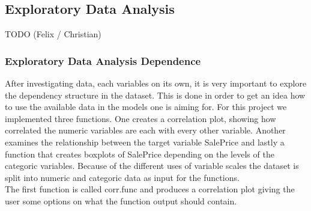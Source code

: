 \subsection{Exploratory Data Analysis}
TODO (Felix / Christian)
\subsubsection{Exploratory Data Analysis Dependence}
After investigating data, each variables on its own, it is very important to explore the dependency structure in the dataset. This is done in order to get an idea how to use the available data in the models one is aiming for. For this project we implemented three functions. One creates a correlation plot, showing how correlated the numeric variables are each with every other variable. Another examines the relationship between the target variable SalePrice and lastly a function that creates boxplots of SalePrice depending on the levels of the categoric variables. Because of the different uses of variable scales the dataset is split into numeric and categoric data as input for the functions. \\
The first function is called corr.func and produces a correlation  plot giving the user some options on what the function output should contain.
